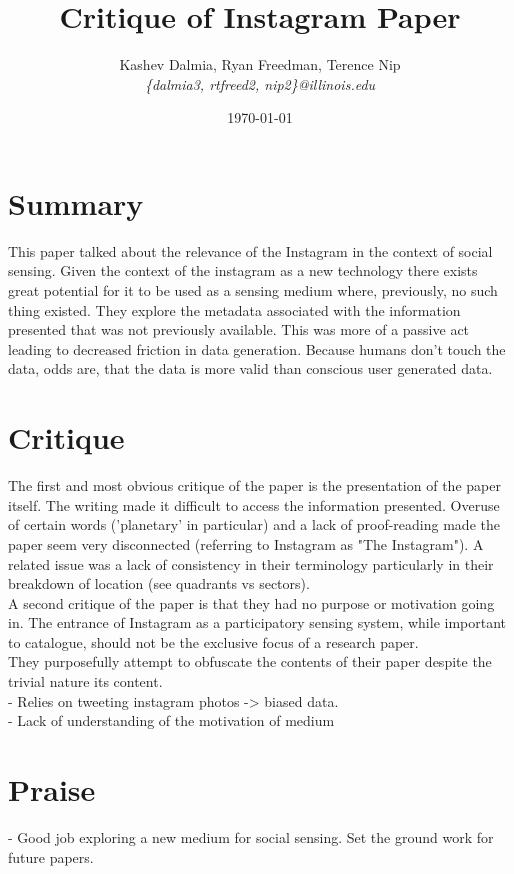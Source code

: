 \documentclass[a4paper]{article}
\title{Critique of Instagram Paper}
\author{Kashev Dalmia, Ryan Freedman, Terence Nip \\
        \textit{\{dalmia3, rtfreed2, nip2\}@illinois.edu}
       }
\date{\today}
\begin{document}
\maketitle

\section{Summary}
This paper talked about the relevance of the Instagram in the context of social sensing. Given the context of the instagram as a new technology there exists great potential for it to be used as a sensing medium where, previously, no such thing existed. They explore the metadata associated with the information presented that was not previously available. This was more of a passive act leading to decreased friction in data generation. Because humans don't touch the data, odds are, that the data is more valid than conscious user generated data. 

\section{Critique}

The first and most obvious critique of the paper is the presentation of the paper itself. The writing made it difficult to access the information presented. Overuse of certain words ('planetary' in particular) and a lack of proof-reading made the paper seem very disconnected (referring to Instagram as "The Instagram"). A related issue was a lack of consistency in their terminology particularly in their breakdown of location (see quadrants vs sectors). \\
A second critique of the paper is that they had no purpose or motivation going in. The entrance of Instagram as a participatory sensing system, while important to catalogue, should not be the exclusive focus of a research paper.\\
They purposefully attempt to obfuscate the contents of their paper despite the trivial nature its content.\\
- Relies on tweeting instagram photos -> biased data. \\
- Lack of understanding of the motivation of medium \\

\section{Praise}
- Good job exploring a new medium for social sensing. Set the ground work for future papers.
\end{document}
